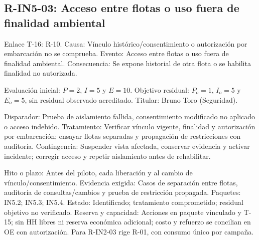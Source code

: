 \subsection{R-IN5-03: Acceso entre flotas o uso fuera de finalidad ambiental}
Enlace T-16: R-10. Causa: Vínculo histórico/consentimiento o autorización por embarcación no se comprueba. Evento: Acceso entre flotas o uso fuera de finalidad ambiental. Consecuencia: Se expone historial de otra flota o se habilita finalidad no autorizada.

Evaluación inicial: $P=2$, $I=5$ y $E=10$. Objetivo residual: $P_o=1$, $I_o=5$ y $E_o=5$, sin residual observado acreditado. Titular: Bruno Toro (Seguridad).

Disparador: Prueba de aislamiento fallida, consentimiento modificado no aplicado o acceso indebido. Tratamiento: Verificar vínculo vigente, finalidad y autorización por embarcación; ensayar flotas separadas y propagación de restricciones con auditoría. Contingencia: Suspender vista afectada, conservar evidencia y activar incidente; corregir acceso y repetir aislamiento antes de rehabilitar.

Hito o plazo: Antes del piloto, cada liberación y al cambio de vínculo/consentimiento. Evidencia exigida: Casos de separación entre flotas, auditoría de consultas/cambios y prueba de restricción propagada. Paquetes: IN5.2; IN5.3; IN5.4. Estado: Identificado; tratamiento comprometido; residual objetivo no verificado. Reserva y capacidad: Acciones en paquete vinculado y T-15; sin HH libres ni reserva económica adicional; costo y refuerzo se concilian en OE con autorización. Para R-IN2-03 rige R-01, con consumo único por campaña.

